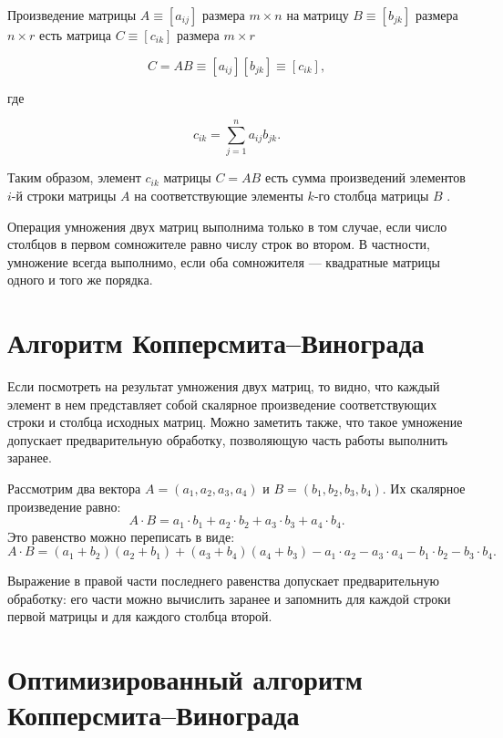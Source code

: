 Произведение матрицы $A \equiv [a_{ij}]$ размера $m \times n$ на матрицу $B \equiv [b_{jk}]$ размера $n \times r$ есть матрица $C \equiv [c_{ik}]$ размера $m \times r$

\begin{equation}
C = AB \equiv [a_{ij}][b_{jk}] \equiv [c_{ik}],
\end{equation}

где

\begin{equation}
c_{ik} = \sum\limits_{j=1}^n a_{ij}b_{jk}.
\end{equation}

Таким образом, элемент $c_{ik}$ матрицы $C = AB$ есть сумма произведений элементов $i$-й строки матрицы $A$ на соответствующие элементы $k$-го столбца матрицы $B$ \cite{Korn1973}.

Операция умножения двух матриц выполнима только в том случае, если число столбцов в первом сомножителе равно числу строк во втором. В частности, умножение всегда выполнимо, если оба сомножителя --- квадратные матрицы одного и того же порядка.

\section{Алгоритм Копперсмита--Винограда}

Если посмотреть на результат умножения двух матриц, то видно, что каждый элемент в нем представляет собой скалярное произведение соответствующих строки и столбца исходных матриц. Можно заметить также, что такое умножение допускает предварительную обработку, позволяющую часть работы выполнить заранее.

Рассмотрим два вектора $A = (a_1, a_2, a_3, a_4)$ и $B = (b_1, b_2, b_3, b_4)$. Их скалярное произведение равно:
\begin{equation}
A \cdot B = a_1 \cdot b_1 + a_2 \cdot b_2 + a_3 \cdot b_3 + a_4 \cdot b_4.
\end{equation}
Это равенство можно переписать в виде:
\begin{equation}
A \cdot B = (a_1 + b_2)(a_2 + b_1) + (a_3 + b_4)(a_4 + b_3) - a_1 \cdot a_2 - a_3 \cdot a_4 - b_1 \cdot b_2 - b_3 \cdot b_4.
\end{equation}

Выражение в правой части последнего равенства допускает предварительную обработку: его части можно вычислить заранее и запомнить для каждой строки первой матрицы и для каждого столбца второй.

\section{Оптимизированный алгоритм Копперсмита--Винограда}


